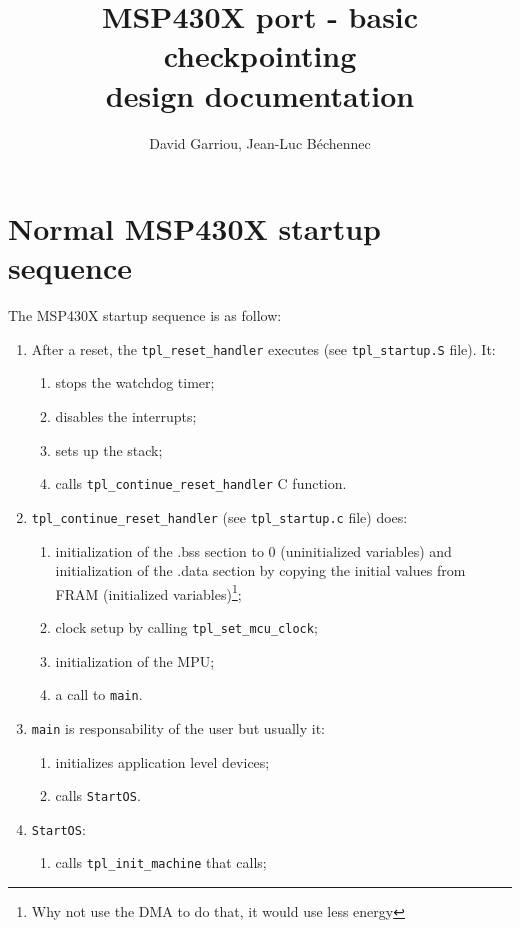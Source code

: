 \documentclass[11pt, oneside]{article}   	%
\title{MSP430X port - basic checkpointing\\design documentation}
\author{David Garriou, Jean-Luc Béchennec}
\begin{document}
\maketitle

\section{Normal MSP430X startup sequence}

The MSP430X startup sequence is as follow:
\begin{enumerate}
\item After a reset, the \lstinline{tpl_reset_handler} executes (see \lstinline{tpl_startup.S} file). It:
	\begin{enumerate}
	\item stops the watchdog timer;
	\item disables the interrupts;
	\item sets up the stack;
	\item calls \lstinline{tpl_continue_reset_handler} C function.
	\end{enumerate}
\item \lstinline{tpl_continue_reset_handler} (see \lstinline{tpl_startup.c} file) does:
	\begin{enumerate}
	\item initialization of the .bss section to 0 (uninitialized variables) and initialization of the .data section by copying the initial values from FRAM (initialized variables)\label{item:bssdatainit}\footnote{Why not use the DMA to do that, it would use less energy};
	\item clock setup by calling \lstinline{tpl_set_mcu_clock}\label{item:clockinit};
	\item initialization of the MPU\label{item:mpuinit}; 
	\item a call to \lstinline{main}\label{item:callmain}.
	\end{enumerate}
\item \lstinline{main} is responsability of the user but usually it:
	\begin{enumerate}
	\item initializes application level devices;
	\item calls \lstinline{StartOS}.
	\end{enumerate}
\item \lstinline{StartOS}:
	\begin{enumerate}
	\item calls \lstinline{tpl_init_machine} that calls;

\end{enumerate}
\end{enumerate}
\end{document}
